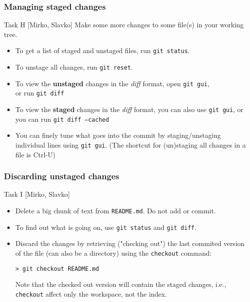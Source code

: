\begin{frame}

\frametitle{Managing staged changes}

	\begin{block}{Task H [Mirko, Slavko]}
	Make some more changes to some file(s) in your working tree.
	\end{block}
	\begin{itemize}	
	
	\item To get a list of staged and unstaged files, run \texttt{git status}.
	\item To unstage all changes, run \texttt{git reset}.
	\item To view the \textbf{unstaged} changes in the \textit{diff} format, open \texttt{git gui}, 
	\\or run \texttt{git diff}

	\item To view the \textbf{staged} changes in the \textit{diff} format, you can also use \texttt{git gui}, or you can run \texttt{git diff --cached}
	
	\item You can finely tune what goes into the commit by staging/unstaging individual lines using \texttt{git gui}.
	(The shortcut for (un)staging all changes in a file is Ctrl-U)
	\end{itemize}
	
\end{frame}



\begin{frame}[fragile]
	\frametitle{Discarding unstaged changes}
	
	\begin{block}{Task I [Mirko, Slavko]}
	\begin{itemize}
	\item Delete a big chunk of text from \texttt{README.md}. Do not add or commit.
	
	\item To find out what is going on, use \texttt{git status} and \texttt{git diff}.
	\medskip	
    \item Discard the changes by retrieving ("checking out") the last commited version of the file (can also be a directory) using the \texttt{checkout} command:

	\begin{verbatim}
> git checkout README.md
	\end{verbatim}
	
	Note that the checked out version will contain the staged changes, i.e., \texttt{checkout} affect only the workspace, not the index.
	\end{itemize}	
	\end{block}
\end{frame}

